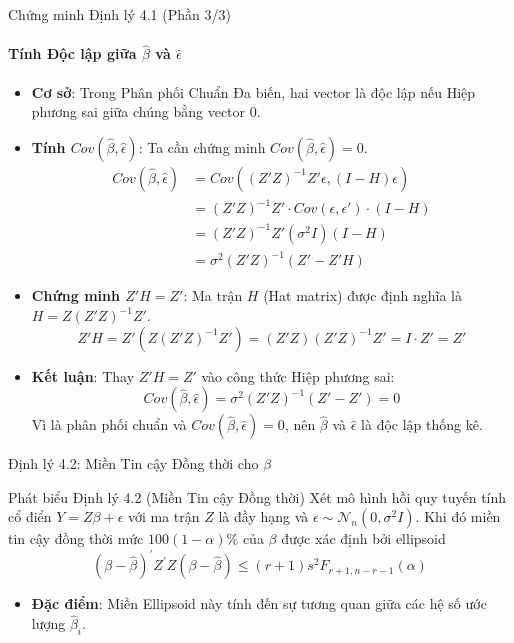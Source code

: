 \begin{frame}{Chứng minh Định lý 4.1 (Phần 3/3)}
    \framesubtitle{Tính Độc lập giữa $\hat{\beta}$ và $\hat{\epsilon}$}

    \begin{itemize}
        \item \textbf{Cơ sở}: Trong Phân phối Chuẩn Đa biến, hai vector là độc lập nếu Hiệp phương sai giữa chúng bằng vector 0.

        \item \textbf{Tính $Cov(\hat{\beta}, \hat{\epsilon})$}: Ta cần chứng minh $Cov(\hat{\beta}, \hat{\epsilon}) = 0$.
        \begin{align*}
            Cov(\hat{\beta}, \hat{\epsilon}) &= Cov\left( (Z'Z)^{-1}Z'\epsilon, (I - H)\epsilon \right) \\
            &= (Z'Z)^{-1}Z' \cdot Cov(\epsilon, \epsilon') \cdot (I - H) \\
            &= (Z'Z)^{-1}Z' (\sigma^2 I) (I - H) \\
            &= \sigma^2 (Z'Z)^{-1} (Z' - Z'H) 
        \end{align*}

        \item \textbf{Chứng minh $Z'H = Z'$}:
        Ma trận $H$ (Hat matrix) được định nghĩa là $H = Z(Z'Z)^{-1}Z'$.
        \[
            Z'H = Z' \left( Z(Z'Z)^{-1}Z' \right) = (Z'Z) (Z'Z)^{-1} Z' = I \cdot Z' = Z'
        \]

        \item \textbf{Kết luận}:
        Thay $Z'H = Z'$ vào công thức Hiệp phương sai:
        \[
            Cov(\hat{\beta}, \hat{\epsilon}) = \sigma^2 (Z'Z)^{-1} (Z' - Z') = 0
        \]
        Vì là phân phối chuẩn và $Cov(\hat{\beta}, \hat{\epsilon}) = 0$, nên $\hat{\beta}$ và $\hat{\epsilon}$ là độc lập thống kê.
    \end{itemize}
\end{frame}
\begin{frame}{Định lý 4.2: Miền Tin cậy Đồng thời cho $\beta$}

    \begin{block}{Phát biểu Định lý 4.2 (Miền Tin cậy Đồng thời)}
        Xét mô hình hồi quy tuyến tính cổ điển $Y=Z\beta+\epsilon$ với ma trận $Z$ là đầy hạng và $\mathcal{\epsilon}\sim\mathcal{N}_{n}(0,\sigma^{2}I).$ Khi đó miền tin cậy đồng thời mức $100(1-\alpha)\%$ của $\beta$ được xác định bởi ellipsoid
        \[
            (\beta-\hat{\beta})^{\prime}Z^{\prime}Z(\beta-\hat{\beta})\le(r+1)s^{2}F_{r+1,n-r-1}(\alpha)
        \]
    \end{block}

     

    \begin{itemize}
        \item \textbf{Đặc điểm}: Miền Ellipsoid này tính đến sự tương quan giữa các hệ số ước lượng $\hat{\beta}_i$.
    \end{itemize}
\end{frame}


